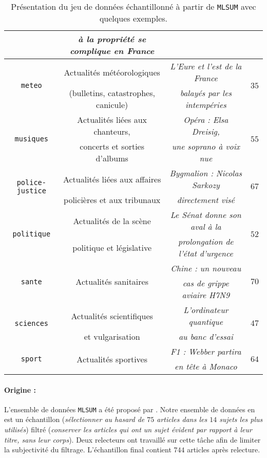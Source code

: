 \begin{table}[!htb]
\begin{center}
\begin{scriptsize}
\begin{tabular}{|c|c|c|c|}
					& \textit{à la propriété se complique en France}
					&
					\tabularnewline
					\hline
				\multirow{2}{*}{\texttt{meteo}}
					& Actualités météorologiques
					& \textit{L'Eure et l'est de la France}
					& \multirow{2}{*}{$35$}
					\tabularnewline
					& (bulletins, catastrophes, canicule)
					& \textit{balayés par les intempéries}
					&
					\tabularnewline
					\hline
				\multirow{2}{*}{\texttt{musiques}}
					& Actualités liées aux chanteurs,
					& \textit{Opéra : Elsa Dreisig,}
					& \multirow{2}{*}{$55$}
					\tabularnewline
					& concerts et sorties d'albums
					& \textit{une soprano à voix nue}
					&
					\tabularnewline
					\hline
				\multirow{2}{*}{\texttt{police-justice}}
					&Actualités liées aux affaires
					& \textit{Bygmalion : Nicolas Sarkozy}
					& \multirow{2}{*}{$67$}
					\tabularnewline
					& policières et aux tribunaux
					& \textit{directement visé}
					&
					\tabularnewline
					\hline
				\multirow{2}{*}{\texttt{politique}}
					& Actualités de la scène
					& \textit{Le Sénat donne son aval à la}
					& \multirow{2}{*}{$52$}
					\tabularnewline
					& politique et législative
					& \textit{prolongation de l'état d'urgence}
					&
					\tabularnewline
					\hline
				\multirow{2}{*}{\texttt{sante}}
					& \multirow{2}{*}{Actualités sanitaires}
					& \textit{Chine : un nouveau}
					& \multirow{2}{*}{$70$}
					\tabularnewline
					&
					& \textit{cas de grippe aviaire H7N9}
					&
					\tabularnewline
					\hline
				\multirow{2}{*}{\texttt{sciences}}
					& Actualités scientifiques
					& \textit{L'ordinateur quantique}
					& \multirow{2}{*}{$47$}
					\tabularnewline
					& et vulgarisation
					& \textit{au banc d'essai}
					&
					\tabularnewline
					\hline
				\multirow{2}{*}{\texttt{sport}}
					& \multirow{2}{*}{Actualités sportives}
					& \textit{F1 : Webber partira}
					& \multirow{2}{*}{$64$}
					\tabularnewline
					&
					& \textit{en tête à Monaco}
					&
					\tabularnewline
					\hline
			\end{tabular}
			\end{scriptsize}
			\end{center}
			\caption{
				Présentation du jeu de données échantillonné à partir de \texttt{MLSUM} avec quelques exemples.
			}
			\label{table:A.2-DATASET-MLSUM-SUBSET-SCHILD}
		\end{table}
		
		\paragraph{Origine :}
		L'ensemble de données \texttt{MLSUM} a été proposé par \cite{scialom-etal:2020:mlsum-multilingual-summarization}.
		Notre ensemble de données en est un échantillon (\textit{sélectionner au hasard de $75$ articles dans les $14$ sujets les plus utilisés}) filtré (\textit{conserver les articles qui ont un sujet évident par rapport à leur titre, sans leur corps}).
		Deux relecteurs ont travaillé sur cette tâche afin de limiter la subjectivité du filtrage.
		L'échantillon final contient $744$ articles après relecture.
		
